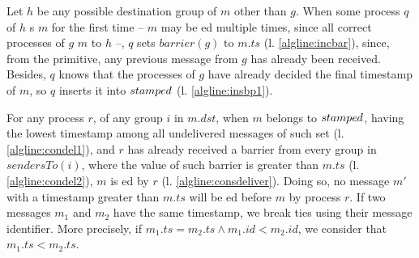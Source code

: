 \documentclass[times, 10pt]{article}
\begin{document}
Let $h$ be any possible destination group of $m$ other than $g$. When some process $q$ of $h$ \rmdel{}s $m$ for the first time -- $m$ may be \rmdel{}ed multiple times, since all correct processes of $g$ \rmcast{} $m$ to $h$ --, $q$ sets $barrier(g)$ to $m.ts$ (l. \ref{algline:incbar}), since, from the \rmcast{} primitive, any previous message from $g$ has already been received. Besides, $q$ knows that the processes of $g$ have already decided the final timestamp of $m$, so $q$ inserts it into $stamped$ (l. \ref{algline:insbp1}).

For any process $r$, of any group $i$ in $m.dst$, when $m$ belongs to $stamped$, having the lowest timestamp among all undelivered messages of such set (l. \ref{algline:condel1}), and $r$ has already received a barrier from every group in $sendersTo(i)$, where the value of such barrier is greater than $m.ts$ (l. \ref{algline:condel2}), $m$ is \amdel{}ed by $r$ (l. \ref{algline:consdeliver}). Doing so, no message $m'$ with a timestamp greater than $m.ts$ will be \amdel{}ed before $m$ by process $r$. If two messages $m_1$ and $m_2$ have the same timestamp, we break ties using their message identifier. More precisely, if $m_1.ts = m_2.ts \wedge m_1.id < m_2.id$, we consider that $m_1.ts < m_2.ts$.








\end{document}
